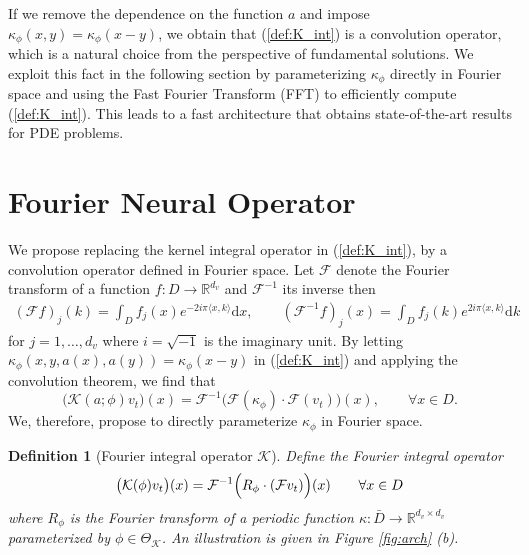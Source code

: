 \documentclass{article} %
\newcommand{\R}{\mathbb{R}}
\newcommand{\cG}{\mathcal{F}}
\newcommand{\cK}{\mathcal{K}}
\newcommand{\bbZ}{\mathbb{Z}}
\newtheorem{definition}{Definition}
\begin{document}
If we remove the dependence on the function \(a\) and impose  $\kappa_{\phi}(x,y) = \kappa_{\phi}(x-y)$, we obtain that (\ref{def:K_int}) is a convolution operator, which is a natural choice from the perspective of fundamental solutions. We exploit this fact in the following section by parameterizing $\kappa_{\phi}$ directly in Fourier space and using the Fast Fourier Transform (FFT) to efficiently compute (\ref{def:K_int}). This leads to a fast architecture that obtains state-of-the-art results for PDE problems.


\section{Fourier Neural Operator}
\label{sec:fourier}
We propose replacing the kernel integral operator in (\ref{def:K_int}), by a convolution operator defined in Fourier space.  Let \(\cG\) denote the Fourier transform of a function $f: D \to \R^{d_v}$ and $\cG^{-1}$ its inverse then
\begin{align*}
    (\cG f)_j(k) = \int_{D} f_j(x) e^{- 2i \pi \langle x, k \rangle} \mathrm{d}x, \qquad
    (\cG^{-1} f)_j(x) = \int_{D} f_j(k) e^{2i \pi \langle x, k \rangle} \mathrm{d}k
\end{align*}
for $j=1,\dots,d_v$ where \(i = \sqrt{-1}\) is the imaginary unit. By letting $\kappa_{\phi}(x,y,a(x),a(y)) = \kappa_{\phi}(x-y)$ in (\ref{def:K_int}) and applying the convolution theorem, we find that
\[\bigl(\cK(a;\phi)v_t\bigr)(x) = \cG^{-1} \bigl( \cG(\kappa_\phi) \cdot \cG(v_t) \bigr )(x), \qquad \forall x \in D. \]
We, therefore, propose to directly parameterize $\kappa_\phi$ in Fourier space.
\begin{definition}[Fourier integral operator $\cK$] Define the Fourier integral operator
\begin{equation}
\label{eq:Fourier}
\bigl(\cK(\phi)v_t\bigr)(x)=   
\cG^{-1}\Bigl(R_\phi \cdot (\cG v_t) \Bigr)(x) \qquad \forall x \in D 
\end{equation}
where $R_\phi$ is the Fourier transform of a periodic function $\kappa: \bar{D} \to \R^{d_v \times d_v}$ parameterized by \(\phi \in \Theta_\cK\).
An illustration is given in Figure \ref{fig:arch} (b).
\end{definition}
\end{document}
